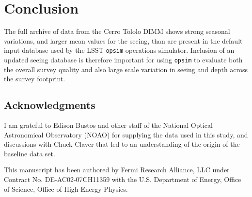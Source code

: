 \documentclass[\docopts]{\docclass}
\begin{document}

\section{Conclusion}
\label{sec:conclusion}

The full archive of data from the Cerro Tololo DIMM shows strong
seasonal variations, and larger mean values for the seeing, than are
present in the default input database used by the LSST \texttt{opsim}
operations simulator. Inclusion of an updated seeing database is
therefore important for using \texttt{opsim} to evaluate both the
overall survey quality and also large scale variation in seeing and
depth across the survey footprint.


\subsection*{Acknowledgments}

I am grateful to Edison Bustos and other staff of the National Optical
Astronomical Observatory (NOAO) for supplying the data used in this
study, and discussions with Chuck Claver that led to an understanding
of the origin of the baseline data set.

This manuscript has been authored by Fermi Research Alliance, LLC
under Contract No. DE-AC02-07CH11359 with the U.S. Department of
Energy, Office of Science, Office of High Energy Physics.











\end{document}
